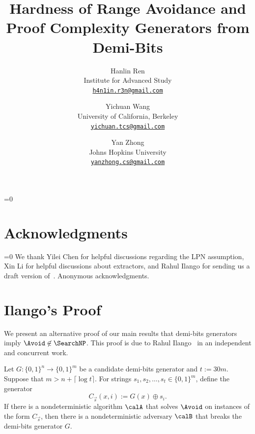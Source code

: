 \documentclass[11pt]{article}
\def\Anonymity{0}%
\begin{document}
\title{Hardness of Range Avoidance and\\Proof Complexity Generators from Demi-Bits}
\ifnum\Anonymity=0
\author{
	Hanlin Ren\\ \small{Institute for Advanced Study} \\ \small{\texttt{\href{mailto:h4n1in.r3n@gmail.com}{h4n1in.r3n@gmail.com}}}
	\and
	Yichuan Wang\\ \small{University of California, Berkeley} \\ \small{\texttt{\href{mailto:yichuan.tcs@gmail.com}{yichuan.tcs@gmail.com}}}
    \and
    Yan Zhong\\ \small{Johns Hopkins University} \\ \small{\texttt{\href{yanzhong.cs@gmail.com}{yanzhong.cs@gmail.com}}}
}
\fi


\maketitle













\section*{Acknowledgments}
\ifnum\Anonymity=0
We thank Yilei Chen for helpful discussions regarding the LPN assumption, Xin Li for helpful discussions about extractors, and Rahul Ilango for sending us a draft version of~\cite{Ilango25}.
\else
Anonymous acknowledgments.
\fi

{\small }

\appendix

\section{Ilango's Proof}\label{sec: RAHUL}
We present an alternative proof of our main results that demi-bits generators imply $\Avoid\not\in\SearchNP$. This proof is due to Rahul Ilango~\cite{Ilango25} in an independent and concurrent work.


\begin{theorem}\label{thm: Ilango25}
    Let $G: \{0, 1\}^n \to \{0, 1\}^m$ be a candidate demi-bits generator and $t := 30m$. Suppose that $m > n + \lceil \log t\rceil$. For strings $s_1, s_2, \dots, s_t\in \{0, 1\}^m$, define the generator
    \[C_{\vec{s}}(x, i) := G(x) \oplus s_i.\]
    If there is a nondeterministic algorithm $\calA$ that solves $\Avoid$ on instances of the form $C_{\vec{s}}$, then there is a nondeterministic adversary $\calB$ that breaks the demi-bits generator $G$.
\end{theorem}
\end{document}
